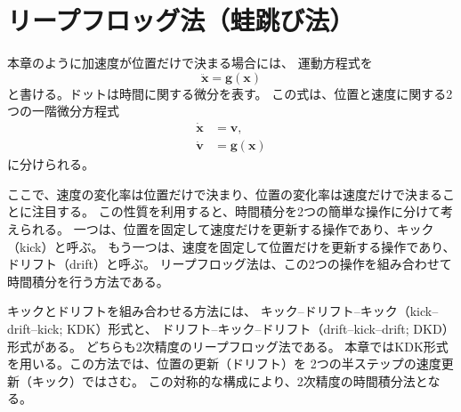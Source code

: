 \section{リープフロッグ法（蛙跳び法）}
\label{sec:ch3-leapfrog}

本章のように加速度が位置だけで決まる場合には、
運動方程式を
\begin{equation}
 \ddot{\boldsymbol{x}}=\boldsymbol{g}(\boldsymbol{x})
\label{eq:ch3-second-order}
\end{equation}
と書ける。ドットは時間に関する微分を表す。
この式は、位置と速度に関する2つの一階微分方程式
\begin{align}
 \dot{\boldsymbol{x}}&=\boldsymbol{v},\\
 \dot{\boldsymbol{v}}&=\boldsymbol{g}(\boldsymbol{x})
\end{align}
に分けられる。

ここで、速度の変化率は位置だけで決まり、位置の変化率は速度だけで決まることに注目する。
この性質を利用すると、時間積分を2つの簡単な操作に分けて考えられる。
一つは、位置を固定して速度だけを更新する操作であり、キック（kick）と呼ぶ。
もう一つは、速度を固定して位置だけを更新する操作であり、ドリフト（drift）と呼ぶ。
リープフロッグ法は、この2つの操作を組み合わせて時間積分を行う方法である。

キックとドリフトを組み合わせる方法には、
キック--ドリフト--キック（kick--drift--kick; KDK）形式と、
ドリフト--キック--ドリフト（drift--kick--drift; DKD）形式がある。
どちらも2次精度のリープフロッグ法である。
本章ではKDK形式を用いる。この方法では、位置の更新（ドリフト）を
2つの半ステップの速度更新（キック）ではさむ。
この対称的な構成により、2次精度の時間積分法となる。

